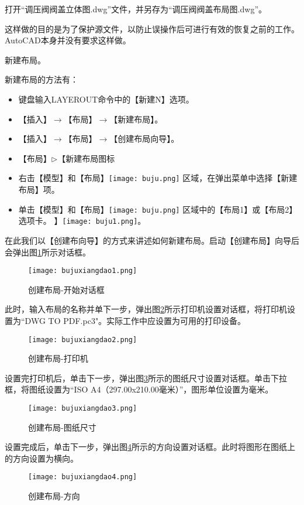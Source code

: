 
\begin{procedure}
\item 打开“调压阀阀盖立体图.dwg”文件，并另存为“调压阀阀盖布局图.dwg”。

这样做的目的是为了保护源文件，以防止误操作后可进行有效的恢复之前的工作。AutoCAD本身并没有要求这样做。
\item 新建布局。

新建布局的方法有：
\begin{itemize}
\item 键盘输入LAYEROUT命令中的【新建N】选项。
\item 【插入】$\rightarrow$【布局】$\rightarrow$【新建布局】。
\item 【插入】$\rightarrow$【布局】$\rightarrow$【创建布局向导】。
\item 【布局】$\triangleright$【新建布局图标
\item 右击【模型】和【布局】\texttt{[image: buju.png]} 区域，在弹出菜单中选择【新建布局】项。
\item 单击【模型】和【布局】\texttt{[image: buju.png]} 区域中的【布局1】或【布局2】选项卡。
】\texttt{[image: buju1.png]}。
\end{itemize}
在此我们以【创建布向导】的方式来讲述如何新建布局。启动【创建布局】向导后会弹出图\ref{fig:bujuxiangdao1}所示对话框。
\begin{figure}[htbp]
\centering
\texttt{[image: bujuxiangdao1.png]}
\caption{创建布局-开始对话框}\label{fig:bujuxiangdao1}
\end{figure}

此时，输入布局的名称并单下一步，弹出图\ref{fig:bujuxiangdao2}所示打印机设置对话框，将打印机设置为“DWG TO PDF.pc3"。实际工作中应设置为可用的打印设备。
\begin{figure}[htbp]
\centering
\texttt{[image: bujuxiangdao2.png]}
\caption{创建布局-打印机}\label{fig:bujuxiangdao2}
\end{figure}

设置完打印机后，单击下一步，弹出图\ref{fig:bujuxiangdao3}所示的图纸尺寸设置对话框。单击下拉框，将图纸设置为“ISO A4（297.00x210.00毫米）”，图形单位设置为毫米。
\begin{figure}[htbp]
\centering
\texttt{[image: bujuxiangdao3.png]}
\caption{创建布局-图纸尺寸}\label{fig:bujuxiangdao3}
\end{figure}

设置完成后，单击下一步，弹出图\ref{fig:bujuxiangdao4}所示的方向设置对话框。此时将图形在图纸上的方向设置为横向。
\begin{figure}[htbp]
\centering
\texttt{[image: bujuxiangdao4.png]}
\caption{创建布局-方向}\label{fig:bujuxiangdao4}
\end{figure}


\end{procedure}
